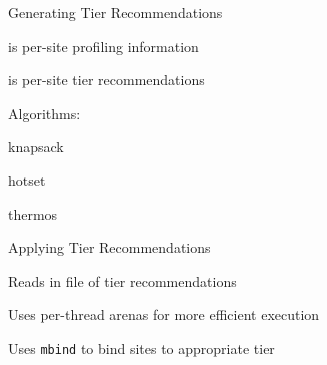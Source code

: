 \documentclass[final,hyperref={pdfpagelabels=false}]{beamer}
\begin{document}
\begin{frame}[fragile]{Generating Tier Recommendations}
  \begin{customlist}{0em}{0em}
    \item {} is per-site profiling information
    \item {} is per-site tier recommendations
    \item Algorithms:
    \begin{customlist}{1em}{0em}
      \item knapsack
      \item hotset
      \item thermos
    \end{customlist}
  \end{customlist}
  \vspace{2em}
  \begin{center}
  \end{center}
\end{frame}

\begin{frame}{Applying Tier Recommendations}
  \begin{customlist}{0em}{0em}
    \item Reads in file of tier recommendations
    \item Uses per-thread arenas for more efficient execution
    \item Uses \texttt{mbind} to bind sites to appropriate tier
  \end{customlist}
  \vspace{2em}
\end{frame}
\end{document}
